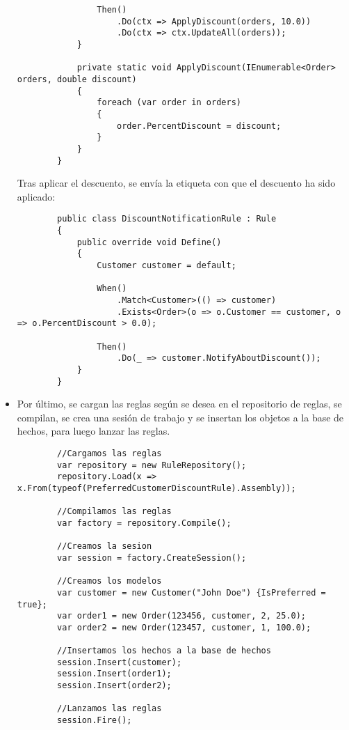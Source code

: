 \begin{itemize}
\begin{lstlisting}
                Then()
                    .Do(ctx => ApplyDiscount(orders, 10.0))
                    .Do(ctx => ctx.UpdateAll(orders));
            }

            private static void ApplyDiscount(IEnumerable<Order> orders, double discount)
            {
                foreach (var order in orders)
                {
                    order.PercentDiscount = discount;
                }
            }
        }
    \end{lstlisting}
    Tras aplicar el descuento, se envía la etiqueta con que el descuento ha sido aplicado:
    \begin{lstlisting}
        public class DiscountNotificationRule : Rule
        {
            public override void Define()
            {
                Customer customer = default;

                When()
                    .Match<Customer>(() => customer)
                    .Exists<Order>(o => o.Customer == customer, o => o.PercentDiscount > 0.0);

                Then()
                    .Do(_ => customer.NotifyAboutDiscount());
            }
        }
    \end{lstlisting}
    \item Por último, se cargan las reglas según se desea en el repositorio de
    reglas, se compilan, se crea una sesión de trabajo y se insertan los objetos
    a la base de hechos, para luego lanzar las reglas.\cite{nrulesGettingStarted}
    \begin{lstlisting}
        //Cargamos las reglas
        var repository = new RuleRepository();
        repository.Load(x => x.From(typeof(PreferredCustomerDiscountRule).Assembly));

        //Compilamos las reglas
        var factory = repository.Compile();

        //Creamos la sesion
        var session = factory.CreateSession();

        //Creamos los modelos
        var customer = new Customer("John Doe") {IsPreferred = true};
        var order1 = new Order(123456, customer, 2, 25.0);
        var order2 = new Order(123457, customer, 1, 100.0);

        //Insertamos los hechos a la base de hechos
        session.Insert(customer);
        session.Insert(order1);
        session.Insert(order2);

        //Lanzamos las reglas
        session.Fire();
    \end{lstlisting}
\end{itemize}